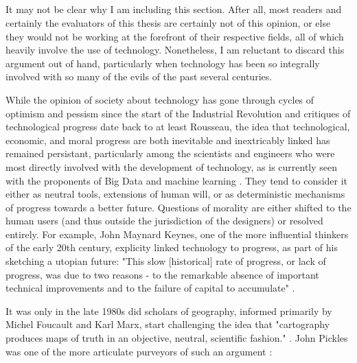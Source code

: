 \subsection{}

It may not be clear why I am including this section. After all, most readers and certainly the evaluators of this thesis are certainly not of this opinion, or else they would not be working at the forefront of their respective fields, all of which heavily involve the use of technology. Nonetheless, I am reluctant to discard this argument out of hand, particularly when technology has been so integrally involved with so many of the evils of the past several centuries.

While the opinion of society about technology has gone through cycles of optimism and pessism since the start of the Industrial Revolution and critiques of technological progress date back to at least Rousseau, the idea that technological, economic, and moral progress are both inevitable and inextricably linked has remained persistant, particularly among the scientists and engineers who were most directly involved with the development of technology\cite{mazlish1963}, as is currently seen with the proponents of Big Data and machine learning \cite{boydCriticalQuestionsBig2012}. They tend to consider it either as neutral tools, extensions of human will, or as deterministic mechanisms of progress towards a better future. Questions of morality are either shifted to the human users (and thus outside the jurisdiction of the designers) or resolved entirely. For example, John Maynard Keynes, one of the more influential thinkers of the early 20th century, explicity linked technology to progress, as part of his sketching a utopian future: "This slow [historical] rate of progress, or lack of progress, was due to two reasons - to the remarkable absence of important technical improvements and to the failure of capital to accumulate" \cite{keynesEconomicPossibilitiesOur2010}.


It was only in the late 1980s did scholars of geography, informed primarily by Michel Foucault and Karl Marx, start challenging the idea that "cartography produces maps of truth in an objective, neutral, scientific fashion." \cite{kitchinThinkingMaps2011}. John Pickles was one of the more articulate purveyors of such an argument \cite{picklesGroundTruthSocial1994}:


